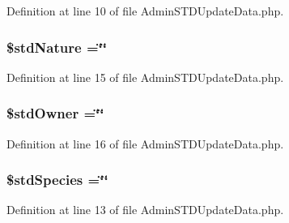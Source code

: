 Definition at line 10 of file Admin\-S\-T\-D\-Update\-Data.\-php.

\hypertarget{_admin_s_t_d_update_data_8php_a53b4aa93fde2c9f30c1eecf48472c395}{
\subsubsection[{\$std\-Nature}]{\setlength{\rightskip}{0pt plus 5cm}\$std\-Nature =\char`\"{}\char`\"{}}}\label{_admin_s_t_d_update_data_8php_a53b4aa93fde2c9f30c1eecf48472c395}


Definition at line 15 of file Admin\-S\-T\-D\-Update\-Data.\-php.

\hypertarget{_admin_s_t_d_update_data_8php_ab6c56dc36eabf5961ac9ee1de239c3a4}{
\subsubsection[{\$std\-Owner}]{\setlength{\rightskip}{0pt plus 5cm}\$std\-Owner =\char`\"{}\char`\"{}}}\label{_admin_s_t_d_update_data_8php_ab6c56dc36eabf5961ac9ee1de239c3a4}


Definition at line 16 of file Admin\-S\-T\-D\-Update\-Data.\-php.

\hypertarget{_admin_s_t_d_update_data_8php_a1d77174f9d4320006ec140e643f95324}{
\subsubsection[{\$std\-Species}]{\setlength{\rightskip}{0pt plus 5cm}\$std\-Species =\char`\"{}\char`\"{}}}\label{_admin_s_t_d_update_data_8php_a1d77174f9d4320006ec140e643f95324}


Definition at line 13 of file Admin\-S\-T\-D\-Update\-Data.\-php.

